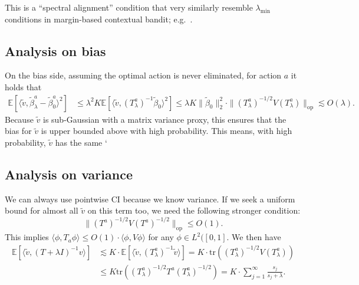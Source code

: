 \documentclass[11pt,a4paper]{article}
\renewcommand{\tilde}{\widetilde}
\theoremstyle{definition}
\theoremstyle{plain}
\theoremstyle{remark}
\newcommand{\op}{\mathrm{op}}
\newcommand{\tr}{\mathrm{tr}}
\begin{document}
This is a ``spectral alignment'' condition that very similarly resemble $\lambda_{\min}$ conditions in margin-based contextual bandit; e.g.~\cite{goldenshluger2013linear}.

\subsection{Analysis on bias}

On the bias side, assuming the optimal action is never eliminated, for action $a$ it holds that
\begin{align*}
\mathbb E[\langle\tilde v,\tilde\beta_\lambda^a-\tilde\beta_0^a\rangle^2] &\leq \lambda^2K\mathbb E[\langle \tilde v, (T_\lambda^a)^{-1}\tilde\beta_0\rangle^2]
\leq \lambda K\|\tilde\beta_0\|_2^2\cdot \|(T_\lambda^a)^{-1/2} V (T_\lambda^a)\|_\op \lesssim O(\lambda).
\end{align*}
Because $\tilde v$ is sub-Gaussian with a matrix variance proxy, this ensures that the bias for $\tilde v$ is upper bounded above with high probability.
This means, with high probability, $\tilde v$ has the same `

\subsection{Analysis on variance}

We can always use pointwise CI because we know variance. If we seek a uniform bound for almost all $\tilde v$ on this term too, we need the following stronger condition:
$$
\|(T^a)^{-1/2} V (T^a)^{-1/2}\|_\op \leq O(1). 
$$
This implies $\langle\phi, T_a \phi\rangle\leq O(1)\cdot \langle\phi, V\phi\rangle$ for any $\phi\in L^2([0,1]$.
We then have
\begin{align*}
\mathbb E[\langle\tilde v, (T+\lambda I)^{-1} v\rangle] &\lesssim K\cdot\mathbb E[\langle\tilde v, (T_\lambda^a)^{-1} \tilde v\rangle] = K\cdot \tr((T_\lambda^a)^{-1/2} V (T_\lambda^a))\\
&\leq K\tr((T_\lambda^a)^{-1/2}T^a(T_\lambda^a)^{-1/2}) = K\cdot \sum_{j=1}^{\infty} \frac{s_j}{s_j+\lambda}.
\end{align*}
\end{document}
